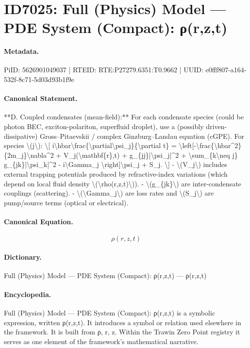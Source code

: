 \section*{ID7025: Full (Physics) Model — PDE System (Compact): ρ(r,z,t)}
\paragraph{Metadata.}
PiID: 5626901049037 | RTEID: RTE:P27279.6351:T0.9662 | UUID: e0fff807-a164-532f-8c71-5d03d93b1f9e

\paragraph{Canonical Statement.}
**D. Coupled condensates (mean-field):** For each condensate species (could be photon BEC, exciton-polariton, superfluid droplet), use a (possibly driven-dissipative) Gross–Pitaevskii / complex Ginzburg–Landau equation (cGPE). For species \textbackslash{}(j\textbackslash{}): \textbackslash{}[ i\textbackslash{}hbar\textbackslash{}frac\{\textbackslash{}partial\textbackslash{}psi\_j\}\{\textbackslash{}partial t\} = \textbackslash{}left[-\textbackslash{}frac\{\textbackslash{}hbar\textasciicircum{}2\}\{2m\_j\}\textbackslash{}nabla\textasciicircum{}2 + V\_j(\textbackslash{}mathbf\{r\},t) + g\_\{jj\}|\textbackslash{}psi\_j|\textasciicircum{}2 + \textbackslash{}sum\_\{k\textbackslash{}neq j\} g\_\{jk\}|\textbackslash{}psi\_k|\textasciicircum{}2 - i\textbackslash{}Gamma\_j \textbackslash{}right]\textbackslash{}psi\_j + S\_j. \textbackslash{}] - \textbackslash{}(V\_j\textbackslash{}) includes external trapping potentials produced by refractive-index variations (which depend on local fluid density \textbackslash{}(\textbackslash{}rho(r,z,t)\textbackslash{})). - \textbackslash{}(g\_\{jk\}\textbackslash{}) are inter-condensate couplings (scattering). - \textbackslash{}(\textbackslash{}Gamma\_j\textbackslash{}) are loss rates and \textbackslash{}(S\_j\textbackslash{}) are pump/source terms (optical or electrical).

\paragraph{Canonical Equation.}
\[
\rho(r,z,t)
\]

\paragraph{Dictionary.}
Full (Physics) Model — PDE System (Compact): ρ(r,z,t) — ρ(r,z,t)

\paragraph{Encyclopedia.}
Full (Physics) Model — PDE System (Compact): ρ(r,z,t) is a symbolic expression, written ρ(r,z,t). It introduces a symbol or relation used elsewhere in the framework. It is built from ρ, r, z. Within the Trawin Zero Point registry it serves as one element of the framework's mathematical narrative.
